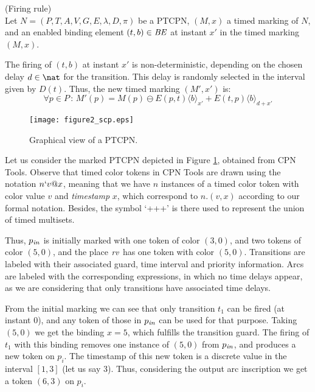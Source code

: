 \bdfn (Firing rule)\\
Let $N=(P,T,A,V,G,E,\lambda,D,\pi)$ be a PTCPN,
$(M,x)$ a timed marking of $N$, and an enabled
binding element $(t,b) \in {\it BE}$ at 
instant $x'$ in the timed marking $(M,x)$.

The firing of $(t,b)$ at instant $x'$ is non-deterministic,
depending on the chosen delay $d \in \nat$ for the transition.
This delay is randomly selected in the interval given by $D(t)$. 
Thus, the new timed marking $(M',x')$ is: 
%
\[
  \forall p \in P\,:\,
  M'(p) = M(p) \ominus E(p,t)\langle b \rangle_{x'} + E(t,p)\langle b
 \rangle_{d+x'}
\]
%
\edfn

\begin{figure}


\hspace*{1.0cm}
\texttt{[image: figure2\_scp.eps]}
% 
\caption{\label{red1}Graphical view of a PTCPN.}
\end{figure}


\bex Let us consider the marked PTCPN depicted in Figure \ref{red1}, 
obtained from CPN Tools. 
% 
Observe that timed color tokens in CPN Tools are drawn
using the notation $n`v@x$,
meaning that we have $n$ instances of a timed color token 
with color value $v$ and {\em timestamp} $x$, which correspond to $n.(v,x)$
according to our formal notation. Besides, the symbol `+++'
is there used to represent the union of timed
multisets. 

Thus, $p_{\it in}$ is initially marked with one token
of color $(3,0)$, and two tokens of color $(5,0)$,
and the place ${\it rv}$ has one token with color
$(5,0)$.  Transitions are labeled
with their associated guard, time interval and priority
information. 
Arcs are labeled with the corresponding expressions,
in which no time delays appear, as we are considering
that only transitions have associated time delays.

From the initial marking we can see that
only transition $t_1$ can be fired (at instant $0$), and
any token of those in $p_{\it in}$ can be used for
that purpose.  Taking $(5,0)$ we get the binding $x=5$,
which fulfills the transition guard.
The firing of $t_1$ with this binding removes
one instance of $(5,0)$ from $p_{\it in}$,
and produces a new token on $p_i$.
The timestamp of this new token is a discrete value
in the interval $[1,3]$ (let us say $3$).
Thus, considering the output
arc inscription we get a token $(6,3)$  on $p_i$.

